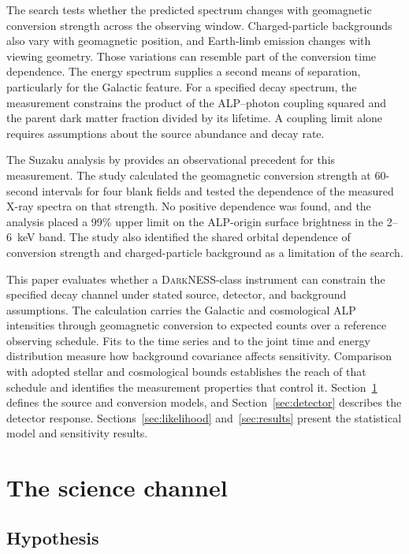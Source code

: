 \documentclass[11pt]{article}
\newcommand{\DarkNESS}{\textsc{DarkNESS}}
\begin{document}
The search tests whether the predicted spectrum changes with geomagnetic conversion strength across the observing window. Charged-particle backgrounds also vary with geomagnetic position, and Earth-limb emission changes with viewing geometry. Those variations can resemble part of the conversion time dependence. The energy spectrum supplies a second means of separation, particularly for the Galactic feature. For a specified decay spectrum, the measurement constrains the product of the ALP--photon coupling squared and the parent dark matter fraction divided by its lifetime. A coupling limit alone requires assumptions about the source abundance and decay rate.

The Suzaku analysis by \citet{yamamoto2020alp} provides an observational precedent for this measurement. The study calculated the geomagnetic conversion strength at 60-second intervals for four blank fields and tested the dependence of the measured X-ray spectra on that strength. No positive dependence was found, and the analysis placed a 99\% upper limit on the ALP-origin surface brightness in the 2--6~keV band. The study also identified the shared orbital dependence of conversion strength and charged-particle background as a limitation of the search.

This paper evaluates whether a \DarkNESS{}-class instrument can constrain the specified decay channel under stated source, detector, and background assumptions. The calculation carries the Galactic and cosmological ALP intensities through geomagnetic conversion to expected counts over a reference observing schedule. Fits to the time series and to the joint time and energy distribution measure how background covariance affects sensitivity. Comparison with adopted stellar and cosmological bounds establishes the reach of that schedule and identifies the measurement properties that control it. Section~\ref{sec:channel} defines the source and conversion models, and Section~\ref{sec:detector} describes the detector response. Sections~\ref{sec:likelihood} and~\ref{sec:results} present the statistical model and sensitivity results.

\section{The science channel}
\label{sec:channel}

\subsection{Hypothesis}
\end{document}

